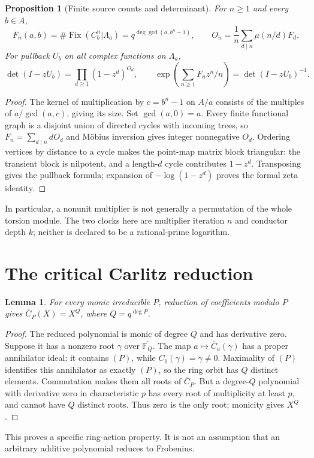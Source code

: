 \documentclass[10pt]{article}
\newtheorem{lemma}{Lemma}
\newtheorem{proposition}{Proposition}
\newcommand{\F}{\mathbb F}
\begin{document}
\begin{proposition}[Finite source counts and determinant]
For $n\geq1$ and every $b\in A$,
\[
 F_n(a,b)=\#\operatorname{Fix}(C_b^n|\Lambda_a)
        =q^{\deg\gcd(a,b^n-1)},\qquad
 O_n=\frac1n\sum_{d\mid n}\mu(n/d)F_d.
\]
For pullback $U_b$ on all complex functions on $\Lambda_a$,
\[
 \det(I-zU_b)=\prod_{d\geq1}(1-z^d)^{O_d},\qquad
 \exp\left(\sum_{n\geq1}F_nz^n/n\right)=\det(I-zU_b)^{-1}.
\]
\end{proposition}
\begin{proof}
The kernel of multiplication by $c=b^n-1$ on $A/a$ consists of the
multiples of $a/\gcd(a,c)$, giving its size. Set $\gcd(a,0)=a$.
Every finite functional graph is a disjoint union of directed cycles with
incoming trees, so $F_n=\sum_{d\mid n}dO_d$ and M\"obius inversion gives
integer nonnegative $O_d$. Ordering vertices by distance to a cycle makes
the point-map matrix block triangular: the transient block is nilpotent,
and a length-$d$ cycle contributes $1-z^d$. Transposing gives the pullback
formula; expansion of $-\log(1-z^d)$ proves the formal zeta identity.
\end{proof}
In particular, a nonunit multiplier is not generally a permutation of the
whole torsion module. The two clocks here are multiplier iteration $n$ and
conductor depth $k$; neither is declared to be a rational-prime logarithm.

\section{The critical Carlitz reduction}
\begin{lemma}
For every monic irreducible $P$, reduction of coefficients modulo $P$ gives
$\overline C_P(X)=X^Q$, where $Q=q^{\deg P}$.
\end{lemma}
\begin{proof}
The reduced polynomial is monic of degree $Q$ and has derivative zero.
Suppose it has a nonzero root $\gamma$ over $\overline{\F_Q}$.
The map $a\mapsto\overline C_a(\gamma)$ has a proper annihilator ideal:
it contains $(P)$, while $C_1(\gamma)=\gamma\ne0$.
Maximality of $(P)$ identifies this annihilator as exactly $(P)$, so the
ring orbit has $Q$ distinct elements. Commutation makes them all roots
of $\overline C_P$. But a degree-$Q$ polynomial with derivative zero in
characteristic $p$ has every root of multiplicity at least $p$, and cannot
have $Q$ distinct roots. Thus zero is the only root; monicity gives $X^Q$.
\end{proof}
This proves a specific ring-action property. It is not an assumption that
an arbitrary additive polynomial reduces to Frobenius.
\end{document}
